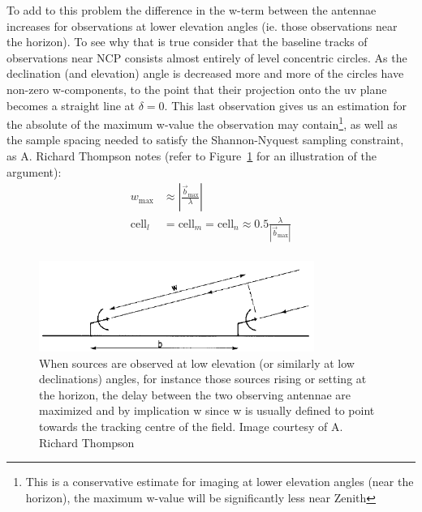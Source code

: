 To add to this problem the difference in the w-term between the antennae increases for observations at lower elevation angles (ie. those observations near the horizon). To see why that
is true consider that the baseline tracks of observations near NCP consists almost entirely of level concentric circles. As the declination (and elevation) angle is decreased 
more and more of the circles have non-zero w-components, to the point that their projection onto the uv plane becomes a straight line at $\delta=0$. This last observation
gives us an estimation for the absolute of the maximum w-value the observation may contain\footnote{This is a conservative estimate for imaging at lower elevation angles (near the horizon),
the maximum w-value will be significantly less near Zenith}, as well as the sample spacing needed to satisfy the Shannon-Nyquest sampling constraint, 
as A. Richard Thompson \cite[Lecture 2]{taylor1999synthesis} notes (refer to Figure~\ref{fig_max_baseline} for an illustration of the argument):
\begin{equation}
 \label{eqn_wmax}
 \begin{split}
  w_{\text{max}} &\approx |\frac{\vec{b}_{\text{max}}}{\lambda}|\\
  \text{cell}_l &= \text{cell}_m = \text{cell}_n \approx 0.5\frac{\lambda}{|\vec{b}_{\text{max}}|}\\
 \end{split}
\end{equation}

\begin{figure}[h!]
  \begin{mdframed}
    \centering
    \includegraphics[width=0.8\textwidth]{images/max_w.png}
    \caption[Maximum w-estimation at low azimuth angle observation]{When sources are observed at low elevation (or similarly at low declinations) angles,
    for instance those sources rising or setting at the horizon, the delay between the two observing antennae are maximized and by implication w since w is usually
    defined to point towards the tracking centre of the field. Image courtesy of A. Richard Thompson \cite[Lecture 2]{taylor1999synthesis}}
    \label{fig_max_baseline}
  \end{mdframed}
\end{figure}

